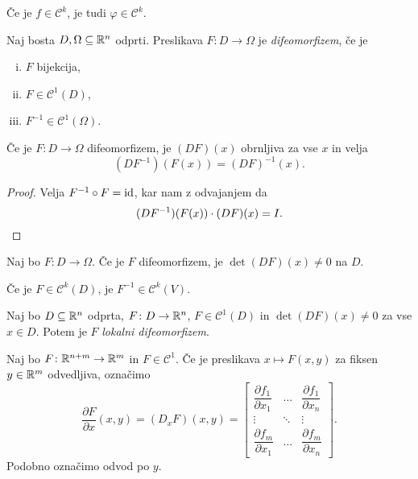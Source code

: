
\begin{opomba}
Če je $f \in \mathcal{C}^k$, je tudi $\varphi \in \mathcal{C}^k$.
\end{opomba}

\begin{definicija}
Naj bosta $D, \Omega \subseteq \mathbb{R}^n$ odprti. Preslikava
$F \colon D \to \Omega$ je \emph{difeomorfizem}, če je

\begin{enumerate}[i)]
\item $F$ bijekcija,
\item $F \in \mathcal{C}^1(D)$,
\item $F^{-1} \in \mathcal{C}^1(\Omega)$.
\end{enumerate}
\end{definicija}

\begin{trditev}
Če je $F \colon D \to \Omega$ difeomorfizem, je $(DF)(x)$ obrnljiva
za vse $x$ in velja
\[
(DF^{-1})(F(x)) = (DF)^{-1}(x).
\]
\end{trditev}

\begin{proof}
Velja $F^{-1} \circ F = \operatorname{id}$, kar nam z odvajanjem da
\[
(DF^{-1})(F(x)) \cdot (DF)(x) = I. \qedhere
\]
\end{proof}

\begin{posledica}
Naj bo $F \colon D \to \Omega$. Če je $F$ difeomorfizem, je
$\det(DF)(x) \ne 0$ na $D$.
\end{posledica}

\begin{opomba}
Če je $F \in \mathcal{C}^k(D)$, je $F^{-1} \in \mathcal{C}^k(V)$.
\end{opomba}

\begin{opomba}
Naj bo $D \subseteq \mathbb{R}^n$ odprta, $F \colon D \to \mathbb{R}^n$,
$F \in \mathcal{C}^1(D)$ in $\det(DF)(x) \ne 0$ za vse $x \in D$.
Potem je $F$ \emph{lokalni difeomorfizem}.
\end{opomba}

\begin{definicija}
Naj bo $F \colon \mathbb{R}^{n+m} \to \mathbb{R}^m$ in $F \in \mathcal{C}^1$.
Če je preslikava $x \mapsto F(x,y)$ za fiksen $y \in \mathbb{R}^m$
odvedljiva, označimo
\[
\frac{\partial F}{\partial x}(x,y) = (D_x F)(x,y) =
\begin{bmatrix}
\dfrac{\partial f_1}{\partial x_1} &
\dots                             &
\dfrac{\partial f_1}{\partial x_n} \\ 
\vdots                            &
\ddots                            &
\vdots                            \\ 
\dfrac{\partial f_m}{\partial x_1} &
\dots                             &
\dfrac{\partial f_m}{\partial x_n}
\end{bmatrix}.
\]
Podobno označimo odvod po $y$.
\end{definicija}

